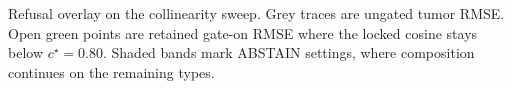Refusal overlay on the collinearity sweep. Grey traces are ungated tumor RMSE. Open green points are retained gate-on RMSE where the locked cosine stays below \(c^\star=0.80\). Shaded bands mark ABSTAIN settings, where composition continues on the remaining types.

